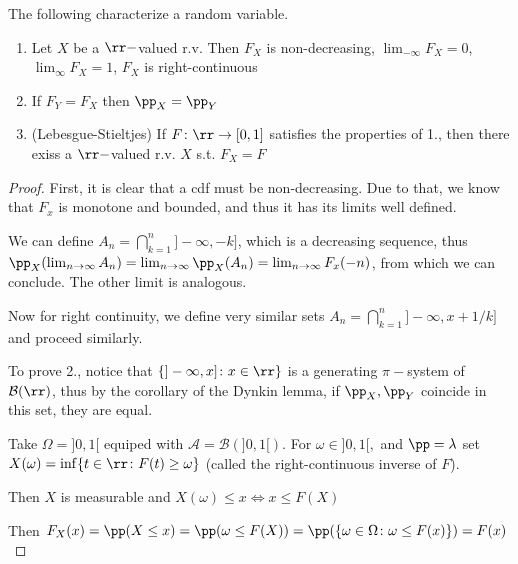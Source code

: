 \documentclass[../main.tex]{subfiles}
\begin{document}
\begin{proposition}
  The following characterize a random variable.
  \begin{enumerate}
      \item Let $X$ be a $\rr-$valued r.v. Then $F_X$ is non-decreasing, $\lim_{-\infty} F_X = 0$,
    $\lim_{\infty} F_X = 1$, $F_X$ is right-continuous
    
      \item If $F_Y = F_X$ then $\pp_X = \pp_Y$

      \item {\sffamily (Lebesgue-Stieltjes)} If $F \colon \rr \to [0, 1]$ satisfies the
        properties of 1., then there exiss a $\rr-$valued r.v. $X$ s.t. $F_X = F$
  \end{enumerate}
\end{proposition}
\begin{proof}
  First, it is clear that a cdf must be non-decreasing. Due to that, we know that $F_x$ is
  monotone and bounded, and thus it has its limits well defined. 
  \vspace{0.5em}

  We can define $A_n = \bigcap_{k = 1}^n ]-\infty, -k]$, which is a decreasing sequence, thus 
  $\pp_X(\lim_{n \to \infty} A_n) = \lim_{n \to \infty} \pp_X(A_n) = \lim_{n \to \infty}
  F_x(-n)$, from which we can conclude. The other limit is analogous.

  \vspace{0.5em}

  Now for right continuity, we define very similar sets $A_n = \bigcap_{k = 1}^n ]-\infty, x +
  1/k]$ and proceed similarly.

  \vspace{0.5em}

  To prove 2., notice that $\{ ]-\infty, x] \colon x \in \rr \} $ is a generating $\pi-$system
  of $\mathcal{B}(\rr)$, thus by the corollary of the Dynkin lemma, if $\pp_X, \pp_Y$ coincide
  in this set, they are equal.

  \vspace{0.6em}

  Take $\Omega =  ]0, 1[$ equiped with $\mathcal{A} = \mathcal{B}(]0, 1[)$. For $\omega \in ]0,
  1[,$ and $\pp = \lambda$ set $X(\omega) = \inf \{ t \in \rr \colon F(t) \geq \omega\} $ (called the
  right-continuous inverse of $F$).

  \noindent Then $X$ is measurable and $X(\omega) \leq x \iff x \leq F(X)$

  Then $F_X(x) = \pp(X \leq x) = \pp(\omega \leq F(X)) = \pp(\{ \omega \in \Omega \colon \omega
    \leq F(x)\}) = F(x) $

\end{proof}
\end{document}
